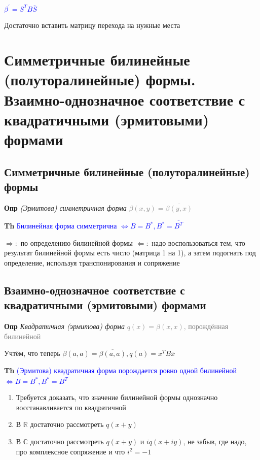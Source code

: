 \documentclass[a4paper, 14pt]{article}
\begin{document}
    \textcolor{blue}{$\beta^{'} = S^T B \overline{S}$}

    Достаточно вставить матрицу перехода на нужные места

    \section{Симметричные билинейные (полуторалинейные) формы.
    Взаимно-однозначное соответствие с квадратичными (эрмитовыми) формами}

    \subsection{Симметричные билинейные (полуторалинейные) формы}

    \textbf{Опр} \textit{(Эрмитова) симметричная форма} \textcolor{gray}{$\beta (x, y) = \overline{\beta (y, x)}$}

    \textbf{Th} \textcolor{blue}{Билинейная форма симметрична $\Leftrightarrow B = B^*, B^* = \overline{B^T}$}

    $\Rightarrow:$ по определению билинейной формы
    $\Leftarrow:$ надо воспользоваться тем, что результат билинейной формы есть число (матрица 1 на 1), а затем
    подогнать под определение, используя транспонирования и сопряжение

    \subsection{Взаимно-однозначное соответствие с квадратичными (эрмитовыми) формами}

    \textbf{Опр} \textit{Квадратичная (эрмитова) форма} \textcolor{gray}{$q(x) = \beta (x, x)$, порождённая билинейной}

    Учтём, что теперь $\beta (a, a) = \overline{\beta (a, a)}, q(a) =  x^T B \overline{x}$

    \textbf{Th} \textcolor{blue}{(Эрмитова) квадратичная форма порождается ровно одной билинейной $\Leftrightarrow B
    = B^*, B^* = \overline{B^T}$}

    \begin{enumerate}
        \item Требуется доказать, что значение билинейной формы однозначно восстанавливается по квадратичной
        \item В $\mathbb{R}$ достаточно рассмотреть $q(x + y)$
        \item В $\mathbb{C}$ достаточно рассмотреть $q(x + y)$ и $iq(x + iy)$, не забыв, где надо, про
        комплексное сопряжение и что $i^2 = -1$
    \end{enumerate}
\end{document}
